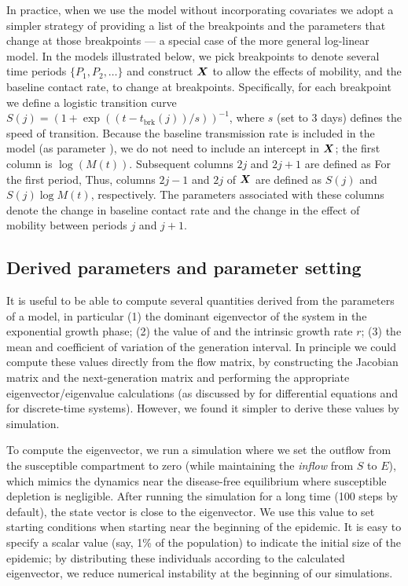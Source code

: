 \documentclass[12pt]{article}\usepackage[]{graphicx}\usepackage[]{color}
\begin{document}
In practice, when we use the model without incorporating covariates we adopt a simpler strategy of providing a list of the breakpoints and the parameters that change at those breakpoints --- a special case of the more general log-linear model. In the models illustrated below, we pick breakpoints to denote several time periods $\{P_1, P_2, \ldots\}$ and construct $\boldsymbol{X}$ to allow the effects of mobility, and the baseline contact rate, to change at breakpoints.
Specifically, for each breakpoint we define a logistic transition curve $S(j) = (1+\exp((t-t_\textrm{brk}(j))/s))^{-1}$, where $s$ (set to 3 days) defines the speed of transition. Because the baseline transmission rate is included in the model (as parameter ), we do not need to include an intercept in $\boldsymbol{X}$; the first column is $\log(M(t))$. Subsequent columns $2j$ and $2j+1$ are defined as 
For the first period, Thus, columns $2j-1$ and $2j$ of $\boldsymbol{X}$ are defined as $S(j)$ and $S(j) \log M(t)$, respectively. The parameters associated with these columns denote the change in baseline contact rate and the change in the effect of mobility between periods $j$ and $j+1$.
  
\subsection*{Derived parameters and parameter setting}

It is useful to be able to compute several quantities derived from the parameters of a model, in particular (1) the dominant eigenvector of the system in the exponential growth phase; (2) the value of \Rzero and the intrinsic growth rate $r$; (3) the mean and coefficient of variation of the generation interval. 
In principle we could compute these values directly from the flow matrix, by constructing the Jacobian matrix and the next-generation matrix and performing the appropriate eigenvector/eigenvalue calculations (as discussed by \cite{VandWatm02} for differential equations and \cite{Casw00} for discrete-time systems). However, we found it simpler to derive these values by simulation.

To compute the eigenvector, we run a simulation where we set the outflow from the susceptible compartment to zero (while maintaining the \emph{inflow} from $S$ to $E$), which mimics the dynamics near the disease-free equilibrium where susceptible depletion is negligible. After running the simulation for a long time (100 steps by default), the state vector is close to the eigenvector.  
We use this value to set starting conditions when starting near the beginning of the epidemic. 
It is easy to specify a scalar value (say, 1\% of the population) to indicate the initial size of the epidemic; by distributing these individuals according to the calculated eigenvector, we reduce numerical instability at the beginning of our simulations. 
\end{document}
